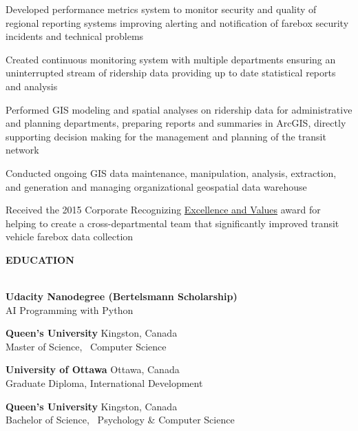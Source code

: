 \documentclass[letterpaper]{article}
\newcommand{\lineunder} {
        \vspace*{-8pt} \\
        \hspace*{-18pt} \hrulefill \\
    }
\newcommand{\header} [1] {
        \vspace{9pt}
        {\hspace*{-18pt}\vspace*{6pt} \large \textbf {#1}}
        \vspace*{-6pt} \lineunder
        \vspace{2pt}
    }
\newenvironment{jobtasklist}
        {
            \vspace{-12pt}
            \begin{itemize} \itemsep 0pt
        }{
            \end{itemize}
            \vspace{-3pt}
        }
\newcommand{\university}[3]{
        \textbf{#1}  %
        \hfill #2\\  %
        #3\\         %
        \vspace{2mm}
    }
\newcommand{\impt}[1]{\uline{#1}}
\begin{document}
\begin{jobtasklist}
{        \item Developed performance metrics system to monitor security and quality
                of regional reporting systems improving alerting and notification of
                farebox security incidents and technical problems

        \item Created continuous monitoring system with multiple departments
                ensuring an uninterrupted stream of ridership data
                providing up to date statistical reports and analysis

        \item Performed GIS modeling and spatial analyses on ridership data for administrative
                and planning departments, preparing reports and summaries in ArcGIS,
                directly supporting decision making for the management and planning of the
                transit network

        \item Conducted ongoing GIS data maintenance, manipulation, analysis, extraction, and generation
                and managing organizational geospatial data warehouse

        \item Received the 2015 Corporate Recognizing \impt{Excellence and Values} award
                for helping to create a cross-departmental team that significantly
                improved transit vehicle farebox data collection
    }


\end{jobtasklist}



\header{EDUCATION}
    \university
        {Udacity Nanodegree (Bertelsmann Scholarship)}
        {}
        {AI Programming with Python}
    \university
        {Queen's University}
        {Kingston, Canada}
        {Master of Science, ~Computer Science}

    \university
        {University of Ottawa}
        {Ottawa, Canada}
        {Graduate Diploma, International Development}

    \university
        {Queen's University}
        {Kingston, Canada}
        {Bachelor of Science, ~Psychology \& Computer Science}
\end{document}
